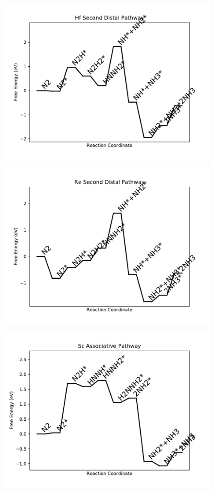 \begin{figure}
\includegraphics[width=0.8\linewidth]{data/plots/Hf_distal_2.pdf}
\end{figure}

\begin{figure}
\includegraphics[width=0.8\linewidth]{data/plots/Re_distal_2.pdf}
\end{figure}

\begin{figure}
\includegraphics[width=0.8\linewidth]{data/plots/Sc_associative.pdf}
\end{figure}

